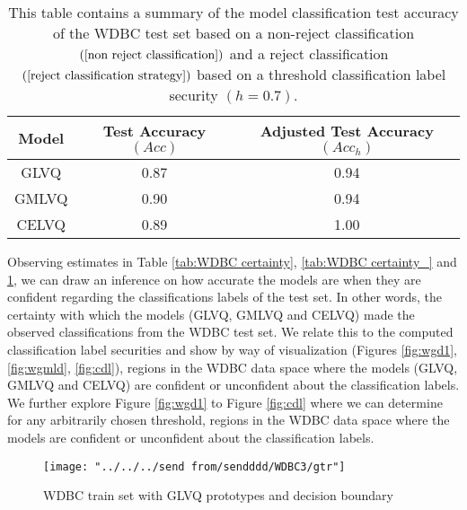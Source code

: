 \documentclass[english]{HSMW-Thesis}
\begin{document}
\begin{table}[H]
	\centering
	\begin{tabular}{ |c|c|c|  }
		\hline
		Model & Test Accuracy $(Acc)$   & Adjusted Test Accuracy $(Acc_{h})$   \\
		\hline
		GLVQ &0.87   &0.94   \\
		GMLVQ &0.90  &0.94   \\
		CELVQ &0.89  &1.00   \\		
		\hline
	\end{tabular}
	\caption[Summary of model classification test accuracy of the WDBC test set]{\label{tab:WDC summary3}This table contains a summary of the model classification test accuracy of the WDBC test set based on a non-reject classification\hspace{2pt}$(\ref{non reject classification})$\hspace{2pt} and a reject classification\hspace{2pt} $(\ref{reject classification strategy})$\hspace{2pt} based on a threshold classification label security\hspace{2pt} $(h=0.7)$.\hspace{2pt}}
\end{table}
Observing estimates in Table \ref{tab:WDBC certainty}, \ref{tab:WDBC certainty_} and \ref{tab:WDC summary3}, we can draw an inference on how accurate the models are when they are confident regarding the classifications labels of the test set. In other words, the certainty with which the models (GLVQ, GMLVQ and CELVQ) made the observed classifications from the WDBC test set. We relate this to the computed classification label securities and show by way of visualization (Figures \ref{fig:wgd1}, \ref{fig:wgmld}, \ref{fig:cdl}), regions in the WDBC data space where the models (GLVQ, GMLVQ and CELVQ) are confident or unconfident about the classification labels. We further explore Figure \ref{fig:wgd1} to Figure \ref{fig:cdl} where we can determine for any arbitrarily chosen threshold, regions in the WDBC data space where the models are confident or unconfident about the classification labels.

\begin{figure}[H]
	\centering
	\texttt{[image: "../../../send from/sendddd/WDBC3/gtr"]}
	\caption[WDBC train set with GLVQ prototypes]{WDBC train set with GLVQ prototypes and decision boundary}
	\label{fig:wg1}
\end{figure}
\end{document}

